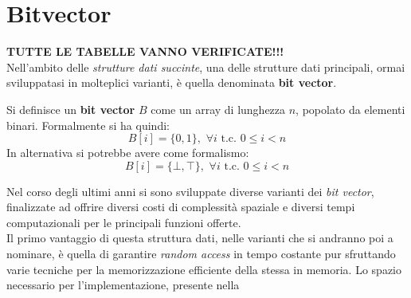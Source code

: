 \section{Bitvector}
\label{bvsec}
\textbf{TUTTE LE TABELLE VANNO VERIFICATE!!!}\\
Nell'ambito delle \textit{strutture dati succinte}, una delle strutture dati
principali, ormai sviluppatasi in molteplici varianti, è quella denominata
\textbf{bit vector}.
\begin{definizione}
  Si definisce un \textbf{bit vector} $B$ come un array di lunghezza $n$,
  popolato da elementi binari. Formalmente si ha quindi:
  \[B[i]=\{0,1\},\,\,\forall i \mbox{ t.c. } 0\leq i < n\]
  In alternativa si potrebbe avere come formalismo:
  \[B[i]=\{\bot,\top\},\,\,\forall i \mbox{ t.c. } 0\leq i < n\]
\end{definizione}
Nel corso degli ultimi anni si sono sviluppate diverse varianti dei \textit{bit
  vector}, finalizzate ad offrire diversi costi di complessità spaziale e
diversi tempi computazionali per le principali funzioni offerte.\\
Il primo vantaggio di questa struttura dati, nelle varianti che si andranno poi
a nominare, è quella di garantire \textit{random access} in tempo costante pur
sfruttando varie tecniche per la memorizzazione efficiente della stessa in
memoria. Lo spazio necessario per l'implementazione, presente nella

